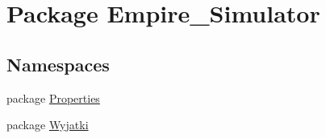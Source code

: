\hypertarget{namespace_empire___simulator}{\section{Package Empire\+\_\+\+Simulator}
\label{namespace_empire___simulator}
}
\subsection*{Namespaces}
\begin{DoxyCompactItemize}
\item 
package \hyperlink{namespace_empire___simulator_1_1_properties}{Properties}
\item 
package \hyperlink{namespace_empire___simulator_1_1_wyjatki}{Wyjatki}
\end{DoxyCompactItemize}
